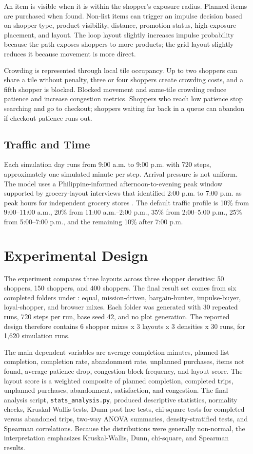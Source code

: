 \documentclass[sigconf,nonacm]{acmart}
\begin{document}
An item is visible when it is within the shopper's exposure radius. Planned items are purchased when found. Non-list items can trigger an impulse decision based on shopper type, product visibility, distance, promotion status, high-exposure placement, and layout. The loop layout slightly increases impulse probability because the path exposes shoppers to more products; the grid layout slightly reduces it because movement is more direct.

Crowding is represented through local tile occupancy. Up to two shoppers can share a tile without penalty, three or four shoppers create crowding costs, and a fifth shopper is blocked. Blocked movement and same-tile crowding reduce patience and increase congestion metrics. Shoppers who reach low patience stop searching and go to checkout; shoppers waiting far back in a queue can abandon if checkout patience runs out.

\subsection{Traffic and Time}

Each simulation day runs from 9:00 a.m. to 9:00 p.m. with 720 steps, approximately one simulated minute per step. Arrival pressure is not uniform. The model uses a Philippine-informed afternoon-to-evening peak window supported by grocery-layout interviews that identified 2:00 p.m. to 7:00 p.m. as peak hours for independent grocery stores \citep{andrada2020}. The default traffic profile is 10\% from 9:00--11:00 a.m., 20\% from 11:00 a.m.--2:00 p.m., 35\% from 2:00--5:00 p.m., 25\% from 5:00--7:00 p.m., and the remaining 10\% after 7:00 p.m.

\section{Experimental Design}

The experiment compares three layouts across three shopper densities: 50 shoppers, 150 shoppers, and 400 shoppers. The final result set comes from six completed folders under : equal, mission-driven, bargain-hunter, impulse-buyer, loyal-shopper, and browser mixes. Each folder was generated with 30 repeated runs, 720 steps per run, base seed 42, and no plot generation. The reported design therefore contains 6 shopper mixes x 3 layouts x 3 densities x 30 runs, for 1,620 simulation runs.

The main dependent variables are average completion minutes, planned-list completion, completion rate, abandonment rate, unplanned purchases, items not found, average patience drop, congestion block frequency, and layout score. The layout score is a weighted composite of planned completion, completed trips, unplanned purchases, abandonment, satisfaction, and congestion. The final analysis script, \texttt{stats\_analysis.py}, produced descriptive statistics, normality checks, Kruskal-Wallis tests, Dunn post hoc tests, chi-square tests for completed versus abandoned trips, two-way ANOVA summaries, density-stratified tests, and Spearman correlations. Because the distributions were generally non-normal, the interpretation emphasizes Kruskal-Wallis, Dunn, chi-square, and Spearman results.
\end{document}
